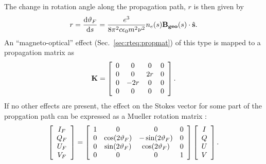 The change in rotation angle along the propagation path, $r$ is then given by
\begin{equation}
  r=\frac{\mathrm{d} \vartheta_{F}}{\mathrm{d} s}=\frac{e^{3}}{8\pi^2
    c\epsilon_{0}m^{2}\nu^{2}}n_{e}(s) {\bf B_{geo}} (s) \cdot 
    \hat{\bf s}. 
 \label{eq:faraday:speed}
\end{equation}
An ``magneto-optical'' effect (Sec.~\ref{sec:rteq:propmat}) of this type is
mapped to a propagation matrix as 
\begin{equation}
 {\bf K} = \left[
\begin{array}{cccc}
0 & 0 & 0 & 0 \\
0 & 0 & 2r & 0 \\
0 & -2r & 0  & 0\\
0 & 0 & 0 & 0\\
\end{array}
\right].
\label{eq:faraday:propmat}
\end{equation}
If no other effects are present, the effect on the Stokes vector for some part
of the propgation path can be expressed as a Mueller rotation matrix
\citep{goldstein:polar:03,meissner:06:polar}:
\begin{equation}
\left[
\begin{array}{c}
I_{F}\\
Q_{F}\\
U_{F}\\
V_{F}\\
\end{array}
\right]
= \left[
\begin{array}{cccc}
1 & 0 & 0 & 0 \\
0 & \cos(2\vartheta_{F}) & -\sin(2\vartheta_{F}) & 0 \\
0 & \sin(2\vartheta_{F}) & \cos(2\vartheta_{F}) & 0\\
0 & 0 & 0 & 1\\
\end{array}
\right]
\left[
\begin{array}{c}
I\\
Q\\
U\\
V\\
\end{array}
\right].
\label{eq:faraday:mueller}
\end{equation}


